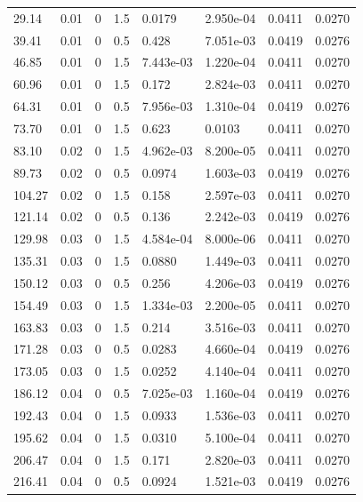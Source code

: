 \documentclass[preview]{standalone}
\begin{document}
{{\begin{tabular}{L{1.2cm}C{1.2cm} C{0.3cm}C{0.5cm} C{1.4cm}C{1.4cm} C{1.4cm}C{1.4cm}}
  29.14  &  0.01  & 0     & 1.5 &  0.0179  & 2.950e-04  & 0.0411 &  0.0270   \\ 
  39.41  &  0.01  & 0     & 0.5 &  0.428  & 7.051e-03  & 0.0419 &  0.0276   \\ 
  46.85  &  0.01  & 0     & 1.5 &  7.443e-03  & 1.220e-04  & 0.0411 &  0.0270   \\ 
  60.96  &  0.01  & 0     & 1.5 &  0.172  & 2.824e-03  & 0.0411 &  0.0270   \\ 
  64.31  &  0.01  & 0     & 0.5 &  7.956e-03  & 1.310e-04  & 0.0419 &  0.0276   \\ 
  73.70  &  0.01  & 0     & 1.5 &  0.623  & 0.0103  & 0.0411 &  0.0270   \\ 
  83.10  &  0.02  & 0     & 1.5 &  4.962e-03  & 8.200e-05  & 0.0411 &  0.0270   \\ 
  89.73  &  0.02  & 0     & 0.5 &  0.0974  & 1.603e-03  & 0.0419 &  0.0276   \\ 
  104.27  &  0.02  & 0     & 1.5 &  0.158  & 2.597e-03  & 0.0411 &  0.0270   \\ 
  121.14  &  0.02  & 0     & 0.5 &  0.136  & 2.242e-03  & 0.0419 &  0.0276   \\ 
  129.98  &  0.03  & 0     & 1.5 &  4.584e-04  & 8.000e-06  & 0.0411 &  0.0270   \\ 
  135.31  &  0.03  & 0     & 1.5 &  0.0880  & 1.449e-03  & 0.0411 &  0.0270   \\ 
  150.12  &  0.03  & 0     & 0.5 &  0.256  & 4.206e-03  & 0.0419 &  0.0276   \\ 
  154.49  &  0.03  & 0     & 1.5 &  1.334e-03  & 2.200e-05  & 0.0411 &  0.0270   \\ 
  163.83  &  0.03  & 0     & 1.5 &  0.214  & 3.516e-03  & 0.0411 &  0.0270   \\ 
  171.28  &  0.03  & 0     & 0.5 &  0.0283  & 4.660e-04  & 0.0419 &  0.0276   \\ 
  173.05  &  0.03  & 0     & 1.5 &  0.0252  & 4.140e-04  & 0.0411 &  0.0270   \\ 
  186.12  &  0.04  & 0     & 0.5 &  7.025e-03  & 1.160e-04  & 0.0419 &  0.0276   \\ 
  192.43  &  0.04  & 0     & 1.5 &  0.0933  & 1.536e-03  & 0.0411 &  0.0270   \\ 
  195.62  &  0.04  & 0     & 1.5 &  0.0310  & 5.100e-04  & 0.0411 &  0.0270   \\ 
  206.47  &  0.04  & 0     & 1.5 &  0.171  & 2.820e-03  & 0.0411 &  0.0270   \\ 
  216.41  &  0.04  & 0     & 0.5 &  0.0924  & 1.521e-03  & 0.0419 &  0.0276   \\ 

\end{tabular}}}
\end{document}
